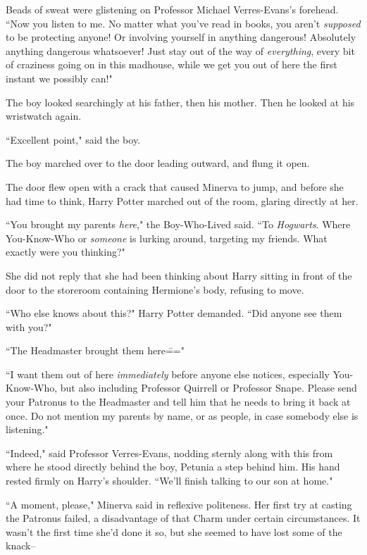 Beads of sweat were glistening on Professor Michael Verres-Evans's forehead. ``Now you listen to me. No matter what you've read in books, you aren't \emph{supposed} to be protecting anyone! Or involving yourself in anything dangerous! Absolutely anything dangerous whatsoever! Just stay out of the way of \emph{everything}, every bit of craziness going on in this madhouse, while we get you out of here the first instant we possibly can!"

The boy looked searchingly at his father, then his mother. Then he looked at his wristwatch again.

``Excellent point," said the boy.

The boy marched over to the door leading outward, and flung it open.

\later

The door flew open with a crack that caused Minerva to jump, and before she had time to think, Harry Potter marched out of the room, glaring directly at her.

``You brought my parents \emph{here}," the Boy-Who-Lived said. ``To \emph{Hogwarts}. Where You-Know-Who or \emph{someone} is lurking around, targeting my friends. What exactly were you thinking?"

She did not reply that she had been thinking about Harry sitting in front of the door to the storeroom containing Hermione's body, refusing to move.

``Who else knows about this?" Harry Potter demanded. ``Did anyone see them with you?"

``The Headmaster brought them here\==="

``I want them out of here \emph{immediately} before anyone else notices, especially You-Know-Who, but also including Professor Quirrell or Professor Snape. Please send your Patronus to the Headmaster and tell him that he needs to bring it back at once. Do not mention my parents by name, or as people, in case somebody else is listening."

``Indeed," said Professor Verres-Evans, nodding sternly along with this from where he stood directly behind the boy, Petunia a step behind him. His hand rested firmly on Harry's shoulder. ``We'll finish talking to our son at home."

``A moment, please," Minerva said in reflexive politeness. Her first try at casting the Patronus failed, a disadvantage of that Charm under certain circumstances. It wasn't the first time she'd done it so, but she seemed to have lost some of the knack\---

